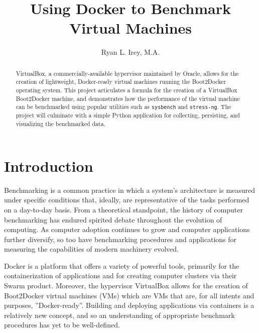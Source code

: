 \documentclass[sigconf]{acmart}
\begin{document}
\title{Using Docker to Benchmark Virtual Machines}

\author{Ryan L. Irey, M.A.}

\renewcommand{\shortauthors}{R. Irey}

\begin{abstract}

VirtualBox, a commercially-available hypervisor maintained by Oracle, allows for the creation of lightweight, Docker-ready virtual machines running the Boot2Docker operating system. This project articulates a formula for the creation of a VirtualBox Boot2Docker machine, and demonstrates how the performance of the virtual machine can be benchmarked using popular utilities such as {\tt sysbench} and {\tt stress-ng}. The project will culminate with a simple Python application for collecting, persisting, and visualizing the benchmarked data.

\end{abstract}


\maketitle

\section{Introduction}

Benchmarking is a common practice in which a system's architecture is measured under specific conditions that, ideally, are representative of the tasks performed on a day-to-day basis. From a theoretical standpoint, the history of computer benchmarking has endured spirited debate throughout the evolution of computing. As computer adoption continues to grow and computer applications further diversify, so too have benchmarking procedures and applications for measuring the capabilities of modern machinery evolved.

Docker is a platform that offers a variety of powerful tools, primarily for the containerization of applications and for creating computer clusters via their Swarm product. Moreover, the hypervisor VirtualBox allows for the creation of Boot2Docker virtual machines (VMs) which are VMs that are, for all intents and purposes, ''Docker-ready''. Building and deploying applications via containers is a relatively new concept, and so an understanding of appropriate benchmark procedures has yet to be well-defined. 
\end{document}
